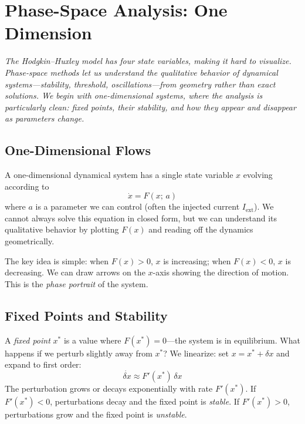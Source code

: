 \chapter{Phase-Space Analysis: One Dimension}
\label{ch:phase-plane-1d}

\textit{The Hodgkin--Huxley model has four state variables, making it hard to visualize. Phase-space methods let us understand the qualitative behavior of dynamical systems---stability, threshold, oscillations---from geometry rather than exact solutions. We begin with one-dimensional systems, where the analysis is particularly clean: fixed points, their stability, and how they appear and disappear as parameters change.}

\section{One-Dimensional Flows}
\label{sec:1d-flows}

A one-dimensional dynamical system has a single state variable $x$ evolving according to
%
\begin{equation}
  \dot{x} = F(x;\, a)
  \label{eq:1d-flow}
\end{equation}
%
where $a$ is a parameter we can control (often the injected current $I_{\text{ext}}$). We cannot always solve this equation in closed form, but we can understand its qualitative behavior by plotting $F(x)$ and reading off the dynamics geometrically.

The key idea is simple: when $F(x) > 0$, $x$ is increasing; when $F(x) < 0$, $x$ is decreasing. We can draw arrows on the $x$-axis showing the direction of motion. This is the \emph{phase portrait} of the system.

\section{Fixed Points and Stability}
\label{sec:fixed-points-1d}

A \emph{fixed point} $x^*$ is a value where $F(x^*) = 0$---the system is in equilibrium. What happens if we perturb slightly away from $x^*$? We linearize: set $x = x^* + \delta x$ and expand to first order:
%
\begin{equation}
  \dot{\delta x} \approx F'(x^*)\,\delta x
  \label{eq:1d-linearization}
\end{equation}
%
The perturbation grows or decays exponentially with rate $F'(x^*)$. If $F'(x^*) < 0$, perturbations decay and the fixed point is \emph{stable}. If $F'(x^*) > 0$, perturbations grow and the fixed point is \emph{unstable}.

